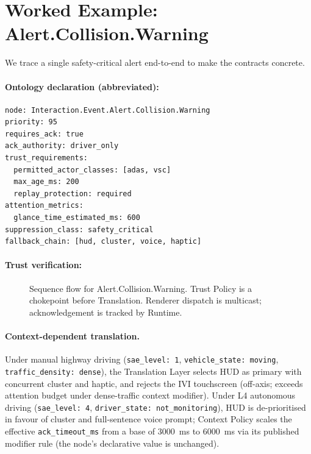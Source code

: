 \documentclass[manuscript,screen,review,anonymous]{acmart}
\begin{document}
\section{Worked Example: Alert.Collision.Warning}

We trace a single safety-critical alert end-to-end to make the contracts
concrete.

\paragraph{Ontology declaration (abbreviated):}

\begin{lstlisting}[language={}]
node: Interaction.Event.Alert.Collision.Warning
priority: 95
requires_ack: true
ack_authority: driver_only
trust_requirements:
  permitted_actor_classes: [adas, vsc]
  max_age_ms: 200
  replay_protection: required
attention_metrics:
  glance_time_estimated_ms: 600
suppression_class: safety_critical
fallback_chain: [hud, cluster, voice, haptic]
\end{lstlisting}

\paragraph{Trust verification:}

\begin{figure}[h]
  \centering
  \caption{Sequence flow for Alert.Collision.Warning. Trust Policy is a
    chokepoint before Translation. Renderer dispatch is multicast;
    acknowledgement is tracked by Runtime.}
  \label{fig:sequence}
\end{figure}

\paragraph{Context-dependent translation.}
Under manual highway driving (\texttt{sae\_level: 1},
\texttt{vehicle\_state: moving}, \texttt{traffic\_density: dense}), the
Translation Layer selects HUD as primary with concurrent cluster and haptic,
and rejects the IVI touchscreen (off-axis; exceeds attention budget under
dense-traffic context modifier). Under L4 autonomous driving
(\texttt{sae\_level: 4}, \texttt{driver\_state: not\_monitoring}), HUD is
de-prioritised in favour of cluster and full-sentence voice prompt; Context
Policy scales the effective \texttt{ack\_timeout\_ms} from a base of 3000~ms
to 6000~ms via its published modifier rule (the node's declarative value is
unchanged).
\end{document}
